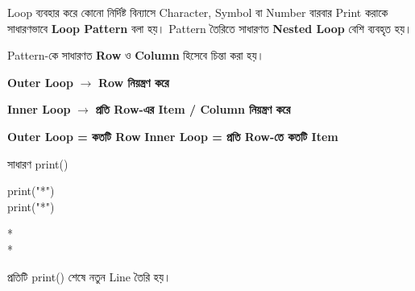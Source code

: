 
Loop ব্যবহার করে কোনো নির্দিষ্ট বিন্যাসে Character, Symbol বা Number
বারবার Print করাকে সাধারণভাবে \textbf{Loop Pattern} বলা হয়।
Pattern তৈরিতে সাধারণত \textbf{Nested Loop} বেশি ব্যবহৃত হয়।



Pattern-কে সাধারণত \textbf{Row} ও \textbf{Column} হিসেবে চিন্তা করা হয়।

\begin{rememberbox}

\begin{center}

\textbf{Outer Loop}
\(\longrightarrow\)
\textbf{Row নিয়ন্ত্রণ করে}

\qquad

\textbf{Inner Loop}
\(\longrightarrow\)
\textbf{প্রতি Row-এর Item / Column নিয়ন্ত্রণ করে}

\medskip

\textbf{Outer Loop = কতটি Row}
\qquad
\textbf{Inner Loop = প্রতি Row-তে কতটি Item}

\end{center}

\end{rememberbox}



\begin{codeoutputbox}{সাধারণ \textenglish{\ttfamily print()}}

\noindent
\begin{minipage}[t]{0.53\linewidth}
\codeheading

\begin{english}
\ttfamily
print("*")\\
print("*")
\end{english}

\end{minipage}
\hfill
\begin{minipage}[t]{0.43\linewidth}
\outputheading

\begin{english}
\ttfamily
*\\
*
\end{english}

প্রতিটি
\textenglish{\ttfamily print()}
শেষে নতুন Line তৈরি হয়।

\end{minipage}

\end{codeoutputbox}

